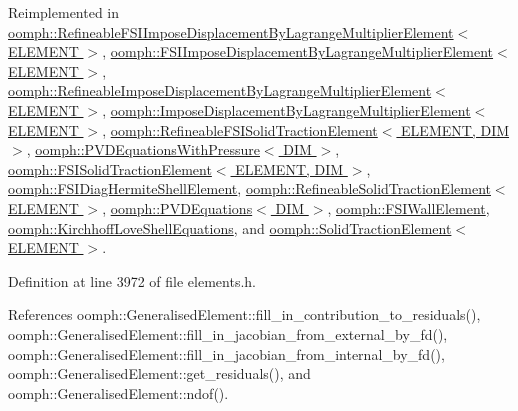 Reimplemented in \hyperlink{classoomph_1_1RefineableFSIImposeDisplacementByLagrangeMultiplierElement_a3c86bf6884cd7cfdfa8e7381fbd16fcf}{oomph\+::\+Refineable\+F\+S\+I\+Impose\+Displacement\+By\+Lagrange\+Multiplier\+Element$<$ E\+L\+E\+M\+E\+N\+T $>$}, \hyperlink{classoomph_1_1FSIImposeDisplacementByLagrangeMultiplierElement_a48006d22e0ad79703914c687390150b8}{oomph\+::\+F\+S\+I\+Impose\+Displacement\+By\+Lagrange\+Multiplier\+Element$<$ E\+L\+E\+M\+E\+N\+T $>$}, \hyperlink{classoomph_1_1RefineableImposeDisplacementByLagrangeMultiplierElement_af0d1b2633de720222d85e2083296a209}{oomph\+::\+Refineable\+Impose\+Displacement\+By\+Lagrange\+Multiplier\+Element$<$ E\+L\+E\+M\+E\+N\+T $>$}, \hyperlink{classoomph_1_1ImposeDisplacementByLagrangeMultiplierElement_a8f196eaf084264031cf36fb541978123}{oomph\+::\+Impose\+Displacement\+By\+Lagrange\+Multiplier\+Element$<$ E\+L\+E\+M\+E\+N\+T $>$}, \hyperlink{classoomph_1_1RefineableFSISolidTractionElement_a886a6bcb5722c9535f6f78ccefdc0646}{oomph\+::\+Refineable\+F\+S\+I\+Solid\+Traction\+Element$<$ E\+L\+E\+M\+E\+N\+T, D\+I\+M $>$}, \hyperlink{classoomph_1_1PVDEquationsWithPressure_ac1d61d6c3be895e5d033cfbcbfc8bd71}{oomph\+::\+P\+V\+D\+Equations\+With\+Pressure$<$ D\+I\+M $>$}, \hyperlink{classoomph_1_1FSISolidTractionElement_a789bdb99ca30e3c7b56adab5be79a59d}{oomph\+::\+F\+S\+I\+Solid\+Traction\+Element$<$ E\+L\+E\+M\+E\+N\+T, D\+I\+M $>$}, \hyperlink{classoomph_1_1FSIDiagHermiteShellElement_a5e48d1c0291cf16cacaa8b42112efe90}{oomph\+::\+F\+S\+I\+Diag\+Hermite\+Shell\+Element}, \hyperlink{classoomph_1_1RefineableSolidTractionElement_ad1921c9d88c2d71c0f3735259faaef35}{oomph\+::\+Refineable\+Solid\+Traction\+Element$<$ E\+L\+E\+M\+E\+N\+T $>$}, \hyperlink{classoomph_1_1PVDEquations_a7a84eddfcf9bd10eec76fd4baa739806}{oomph\+::\+P\+V\+D\+Equations$<$ D\+I\+M $>$}, \hyperlink{classoomph_1_1FSIWallElement_a7817d2662c24540d3757cb1a1194a635}{oomph\+::\+F\+S\+I\+Wall\+Element}, \hyperlink{classoomph_1_1KirchhoffLoveShellEquations_a2c8049fa371d484a43e157ebef54b474}{oomph\+::\+Kirchhoff\+Love\+Shell\+Equations}, and \hyperlink{classoomph_1_1SolidTractionElement_a7f6315287b8d863631a06b75e0cc7daf}{oomph\+::\+Solid\+Traction\+Element$<$ E\+L\+E\+M\+E\+N\+T $>$}.



Definition at line 3972 of file elements.\+h.



References oomph\+::\+Generalised\+Element\+::fill\+\_\+in\+\_\+contribution\+\_\+to\+\_\+residuals(), oomph\+::\+Generalised\+Element\+::fill\+\_\+in\+\_\+jacobian\+\_\+from\+\_\+external\+\_\+by\+\_\+fd(), oomph\+::\+Generalised\+Element\+::fill\+\_\+in\+\_\+jacobian\+\_\+from\+\_\+internal\+\_\+by\+\_\+fd(), oomph\+::\+Generalised\+Element\+::get\+\_\+residuals(), and oomph\+::\+Generalised\+Element\+::ndof().

